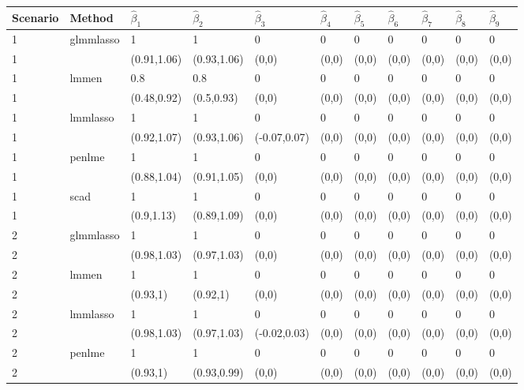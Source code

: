 \documentclass[varwidth, border={10 5 10 5}]{standalone}
\begin{document}
\begin{table}[ht]
\centering
\begin{tabular}{lllllllllll}
  \hline
Scenario & Method & $\hat{\beta}_{1}$ & $\hat{\beta}_{2}$ & $\hat{\beta}_{3}$ & $\hat{\beta}_{4}$ & $\hat{\beta}_{5}$ & $\hat{\beta}_{6}$ & $\hat{\beta}_{7}$ & $\hat{\beta}_{8}$ & $\hat{\beta}_{9}$ \\ 
  \hline
1 & \multirow{2}{*}{glmmlasso} & 1 & 1 & 0 & 0 & 0 & 0 & 0 & 0 & 0 \\ 
  1 &  & (0.91,1.06) & (0.93,1.06) & (0,0) & (0,0) & (0,0) & (0,0) & (0,0) & (0,0) & (0,0) \\ 
  1 & \multirow{2}{*}{lmmen} & 0.8 & 0.8 & 0 & 0 & 0 & 0 & 0 & 0 & 0 \\ 
  1 &  & (0.48,0.92) & (0.5,0.93) & (0,0) & (0,0) & (0,0) & (0,0) & (0,0) & (0,0) & (0,0) \\ 
  1 & \multirow{2}{*}{lmmlasso} & 1 & 1 & 0 & 0 & 0 & 0 & 0 & 0 & 0 \\ 
  1 &  & (0.92,1.07) & (0.93,1.06) & (-0.07,0.07) & (0,0) & (0,0) & (0,0) & (0,0) & (0,0) & (0,0) \\ 
  1 & \multirow{2}{*}{penlme} & 1 & 1 & 0 & 0 & 0 & 0 & 0 & 0 & 0 \\ 
  1 &  & (0.88,1.04) & (0.91,1.05) & (0,0) & (0,0) & (0,0) & (0,0) & (0,0) & (0,0) & (0,0) \\ 
  1 & \multirow{2}{*}{scad} & 1 & 1 & 0 & 0 & 0 & 0 & 0 & 0 & 0 \\ 
  1 &  & (0.9,1.13) & (0.89,1.09) & (0,0) & (0,0) & (0,0) & (0,0) & (0,0) & (0,0) & (0,0) \\ 
  2 & \multirow{2}{*}{glmmlasso} & 1 & 1 & 0 & 0 & 0 & 0 & 0 & 0 & 0 \\ 
  2 &  & (0.98,1.03) & (0.97,1.03) & (0,0) & (0,0) & (0,0) & (0,0) & (0,0) & (0,0) & (0,0) \\ 
  2 & \multirow{2}{*}{lmmen} & 1 & 1 & 0 & 0 & 0 & 0 & 0 & 0 & 0 \\ 
  2 &  & (0.93,1) & (0.92,1) & (0,0) & (0,0) & (0,0) & (0,0) & (0,0) & (0,0) & (0,0) \\ 
  2 & \multirow{2}{*}{lmmlasso} & 1 & 1 & 0 & 0 & 0 & 0 & 0 & 0 & 0 \\ 
  2 &  & (0.98,1.03) & (0.97,1.03) & (-0.02,0.03) & (0,0) & (0,0) & (0,0) & (0,0) & (0,0) & (0,0) \\ 
  2 & \multirow{2}{*}{penlme} & 1 & 1 & 0 & 0 & 0 & 0 & 0 & 0 & 0 \\ 
  2 &  & (0.93,1) & (0.93,0.99) & (0,0) & (0,0) & (0,0) & (0,0) & (0,0) & (0,0) & (0,0) \\ 

\end{tabular}
\end{table}
\end{document}
